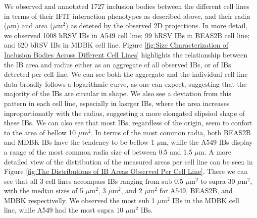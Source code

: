  We observed and annotated 1727 inclusion bodies between the different cell lines in terms of their IFIT interaction phenotypes as described above, and their radia (\(\mu \mbox{m}\)) and area (\(\mu \mbox{m}^2\)) as deteted by the observed 2D projections. In more detail, we observed 1008 hRSV IBs in A549 cell line; 99 hRSV IBs in BEAS2B cell line; and 620 bRSV IBs in MDBK cell line. Figure \ref{fig:Size Characterization of Inclusion Bodies Across Different Cell Lines} highlights the relationship between the IB area and radius either as an aggregate of all observed IBs, or of IBs detected per cell line. We can see both the aggregate and the individual cell line data broadly follows a logarithmic curve, as one can expect, suggesting that the majority of the IBs are circular in shape. We also see a deviation from this pattern in each cell line, especially in lasrger IBs, where the area increases inproportionatly with the radius, suggesting a more elongated elipsiod shape of these IBs. We can also see that most IBs, regardless of the origin, seem to confort to the area of bellow 10 \(\mu \mbox{m}^2\). In terms of the most common radia, both BEAS2B and MDBK IBs have the tendency to be bellow 1 \(\mu \mbox{m}\), while the A549 IBs display a range of the most common radia size of between 0.5 and 1.5 \(\mu \mbox{m}\). A more detailed view of the distribution of the measured areas per cell line can be seen in Figure \ref{fig:The Distributions of IB Areas Observed Per Cell Line}. There we can see that all 3 cell lines accompass IBs ranging from sub 0.5 \(\mu \mbox{m}^2\) to supra 30 \(\mu \mbox{m}^2\), with the median sizes of 5 \(\mu \mbox{m}^2\), 3 \(\mu \mbox{m}^2\), and 2 \(\mu \mbox{m}^2\) for A549, BEAS2B, and MDBK respectivelly. We observed the most sub 1 \(\mu \mbox{m}^2\) IBs in the MDBK cell line, while A549 had the most supra 10 \(\mu \mbox{m}^2\) IBs.

